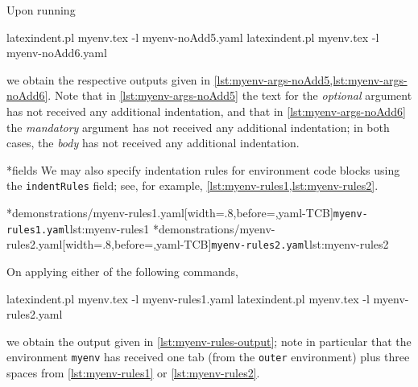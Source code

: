 	Upon running
	\begin{commandshell}
latexindent.pl myenv.tex -l myenv-noAdd5.yaml  
latexindent.pl myenv.tex -l myenv-noAdd6.yaml  
\end{commandshell}
	we obtain the respective outputs given in \cref{lst:myenv-args-noAdd5,lst:myenv-args-noAdd6}. Note that in
	\cref{lst:myenv-args-noAdd5} the text for the \emph{optional} argument has not
	received any additional indentation, and that in \cref{lst:myenv-args-noAdd6} the
	\emph{mandatory} argument has not received any additional indentation; in both
	cases, the \emph{body} has not received any additional indentation.

	\begin{minipage}{.45\textwidth}
	\end{minipage}
	\hfill
	\begin{minipage}{.45\textwidth}
	\end{minipage}

*{fields}
	We may also specify indentation rules for environment code blocks using the
	\texttt{indentRules} field; see, for example, \cref{lst:myenv-rules1,lst:myenv-rules2}.

	\begin{cmhtcbraster}[raster column skip=.1\linewidth]
		\cmhlistingsfromfile[style=yaml-LST]*{demonstrations/myenv-rules1.yaml}[width=.8\linewidth,before=\centering,yaml-TCB]{\texttt{myenv-rules1.yaml}}{lst:myenv-rules1}
		\cmhlistingsfromfile[style=yaml-LST]*{demonstrations/myenv-rules2.yaml}[width=.8\linewidth,before=\centering,yaml-TCB]{\texttt{myenv-rules2.yaml}}{lst:myenv-rules2}
	\end{cmhtcbraster}

	On applying either of the following commands,
	\begin{commandshell}
latexindent.pl myenv.tex -l myenv-rules1.yaml  
latexindent.pl myenv.tex -l myenv-rules2.yaml  
\end{commandshell}
	we obtain the output given in \cref{lst:myenv-rules-output}; note in particular that the
	environment \texttt{myenv} has received one tab (from the
	\texttt{outer} environment) plus three spaces from \cref{lst:myenv-rules1} or
	\ref{lst:myenv-rules2}.

